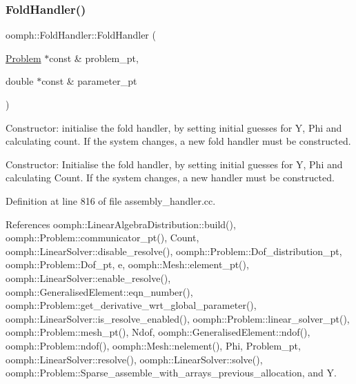 \subsubsection{\texorpdfstring{Fold\+Handler()}{FoldHandler()}\hspace{0.1cm}{\footnotesize\ttfamily [1/3]}}
{\footnotesize\ttfamily oomph\+::\+Fold\+Handler\+::\+Fold\+Handler (\begin{DoxyParamCaption}\item[{\hyperlink{classoomph_1_1Problem}{Problem} $\ast$const \&}]{problem\+\_\+pt,  }\item[{double $\ast$const \&}]{parameter\+\_\+pt }\end{DoxyParamCaption})}



Constructor\+: initialise the fold handler, by setting initial guesses for Y, Phi and calculating count. If the system changes, a new fold handler must be constructed. 

Constructor\+: Initialise the fold handler, by setting initial guesses for Y, Phi and calculating Count. If the system changes, a new handler must be constructed. 

Definition at line 816 of file assembly\+\_\+handler.\+cc.



References oomph\+::\+Linear\+Algebra\+Distribution\+::build(), oomph\+::\+Problem\+::communicator\+\_\+pt(), Count, oomph\+::\+Linear\+Solver\+::disable\+\_\+resolve(), oomph\+::\+Problem\+::\+Dof\+\_\+distribution\+\_\+pt, oomph\+::\+Problem\+::\+Dof\+\_\+pt, e, oomph\+::\+Mesh\+::element\+\_\+pt(), oomph\+::\+Linear\+Solver\+::enable\+\_\+resolve(), oomph\+::\+Generalised\+Element\+::eqn\+\_\+number(), oomph\+::\+Problem\+::get\+\_\+derivative\+\_\+wrt\+\_\+global\+\_\+parameter(), oomph\+::\+Linear\+Solver\+::is\+\_\+resolve\+\_\+enabled(), oomph\+::\+Problem\+::linear\+\_\+solver\+\_\+pt(), oomph\+::\+Problem\+::mesh\+\_\+pt(), Ndof, oomph\+::\+Generalised\+Element\+::ndof(), oomph\+::\+Problem\+::ndof(), oomph\+::\+Mesh\+::nelement(), Phi, Problem\+\_\+pt, oomph\+::\+Linear\+Solver\+::resolve(), oomph\+::\+Linear\+Solver\+::solve(), oomph\+::\+Problem\+::\+Sparse\+\_\+assemble\+\_\+with\+\_\+arrays\+\_\+previous\+\_\+allocation, and Y.

\mbox{\label{classoomph_1_1FoldHandler_ac50106424b3fa4e3346231ec41b7a89f}} 
